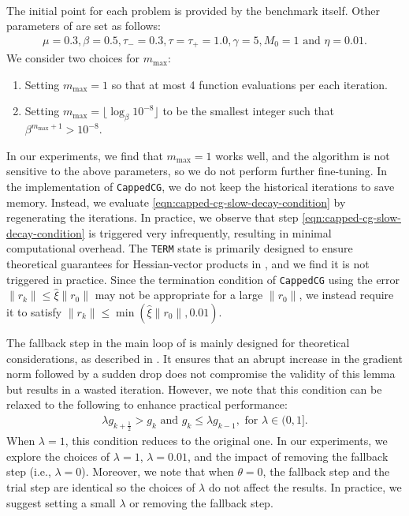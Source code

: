 \paragraph{}
The initial point for each problem is provided by the benchmark itself.
Other parameters of  are set as follows:
\begin{align*}
\mu = 0.3,
\beta = 0.5,
\tau_- = 0.3, 
\tau = \tau_+ = 1.0,
\gamma = 5,
M_0 = 1 
\text{ and } 
\eta = 0.01.
\end{align*}
We consider two choices for $m_{\mathrm{max}}$:
\begin{enumerate}
    \item Setting $m_{\mathrm{max}} = 1$ so that at most 4 function evaluations per each iteration.
    \item Setting $m_{\mathrm{max}} = \lfloor \log_\beta 10^{-8} \rfloor$ to be the smallest integer such that $\beta^{m_{\mathrm{max}}+1} > 10^{-8}$.
\end{enumerate}
In our experiments, we find that $m_{\mathrm{max}} = 1$ works well, 
and the algorithm is not sensitive to the above parameters, so we do not perform further fine-tuning.
In the implementation of \texttt{CappedCG}, we do not keep the historical iterations to save memory.
Instead, we evaluate \eqref{eqn:capped-cg-slow-decay-condition} by regenerating the iterations. 
In practice, we observe that step \eqref{eqn:capped-cg-slow-decay-condition} is triggered very infrequently, resulting in minimal computational overhead.
The \texttt{TERM} state is primarily designed to ensure theoretical guarantees for Hessian-vector products in , 
and we find it is not triggered in practice. 
Since the termination condition of \texttt{CappedCG} using the error $\|r_k\| \leq \hat \xi \|r_0\|$ may not be appropriate for a large $\|r_0\|$, 
we instead require it to satisfy  $\|r_k\| \leq \min(\hat \xi \|r_0\|, 0.01)$.

The fallback step in the main loop of  is mainly designed for theoretical considerations, as described in .
It ensures that an abrupt increase in the gradient norm followed by a sudden drop does not compromise the validity of this lemma
but results in a wasted iteration.
However, we note that this condition can be relaxed to the following to enhance practical performance:
\begin{align}
    \label{eqn:appendix/fallback-relaxed}
    \lambda g_{k + \frac{1}{2}} >  g_k
    \text{ and }
    g_k \leq \lambda g_{k-1}, \text{ for } \lambda \in (0, 1].
\end{align}
When $\lambda = 1$,
this condition reduces to the original one. In our experiments, we explore the choices of 
$\lambda = 1$, $\lambda = 0.01$, and the impact of removing the fallback step (i.e., $\lambda = 0$).
Moreover, we note that when $\theta = 0$, the fallback step and the trial step are identical so the choices of $\lambda$ do not affect the results.
In practice, we suggest setting a small $\lambda$ or removing the fallback step. 

